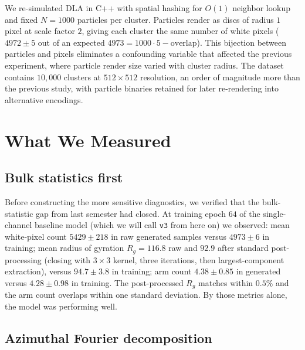 \documentclass[11pt]{article}
\begin{document}
We re-simulated DLA in C++ with spatial hashing for $O(1)$ neighbor lookup and fixed $N = 1000$ particles per cluster. Particles render as discs of radius $1$ pixel at scale factor $2$, giving each cluster the same number of white pixels ($4972 \pm 5$ out of an expected $4973 = 1000 \cdot 5 - \text{overlap}$). This bijection between particles and pixels eliminates a confounding variable that affected the previous experiment, where particle render size varied with cluster radius. The dataset contains $10{,}000$ clusters at $512 \times 512$ resolution, an order of magnitude more than the previous study, with particle binaries retained for later re-rendering into alternative encodings.

\section{What We Measured}

\subsection{Bulk statistics first}

Before constructing the more sensitive diagnostics, we verified that the bulk-statistic gap from last semester had closed. At training epoch $64$ of the single-channel baseline model (which we will call \texttt{v3} from here on) we observed: mean white-pixel count $5429 \pm 218$ in raw generated samples versus $4973 \pm 6$ in training; mean radius of gyration $R_g = 116.8$ raw and $92.9$ after standard post-processing (closing with $3 \times 3$ kernel, three iterations, then largest-component extraction), versus $94.7 \pm 3.8$ in training; arm count $4.38 \pm 0.85$ in generated versus $4.28 \pm 0.98$ in training. The post-processed $R_g$ matches within $0.5\%$ and the arm count overlaps within one standard deviation. By those metrics alone, the model was performing well.

\subsection{Azimuthal Fourier decomposition}
\end{document}
